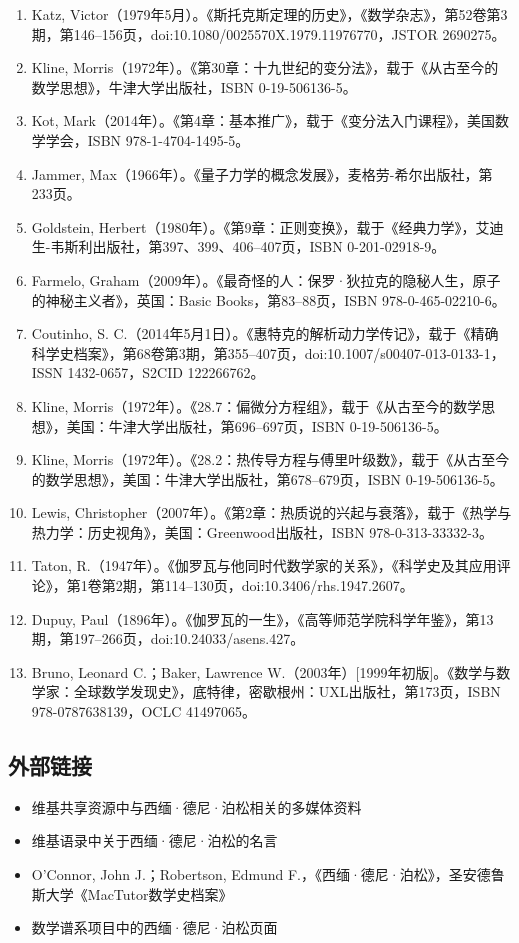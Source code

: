 \begin{enumerate}
\item Katz, Victor（1979年5月）。《斯托克斯定理的历史》，《数学杂志》，第52卷第3期，第146–156页，doi:10.1080/0025570X.1979.11976770，JSTOR 2690275。
\item Kline, Morris（1972年）。《第30章：十九世纪的变分法》，载于《从古至今的数学思想》，牛津大学出版社，ISBN 0-19-506136-5。
\item Kot, Mark（2014年）。《第4章：基本推广》，载于《变分法入门课程》，美国数学学会，ISBN 978-1-4704-1495-5。
\item Jammer, Max（1966年）。《量子力学的概念发展》，麦格劳-希尔出版社，第233页。
\item Goldstein, Herbert（1980年）。《第9章：正则变换》，载于《经典力学》，艾迪生-韦斯利出版社，第397、399、406–407页，ISBN 0-201-02918-9。
\item Farmelo, Graham（2009年）。《最奇怪的人：保罗·狄拉克的隐秘人生，原子的神秘主义者》，英国：Basic Books，第83–88页，ISBN 978-0-465-02210-6。
\item Coutinho, S. C.（2014年5月1日）。《惠特克的解析动力学传记》，载于《精确科学史档案》，第68卷第3期，第355–407页，doi:10.1007/s00407-013-0133-1，ISSN 1432-0657，S2CID 122266762。
\item Kline, Morris（1972年）。《28.7：偏微分方程组》，载于《从古至今的数学思想》，美国：牛津大学出版社，第696–697页，ISBN 0-19-506136-5。
\item Kline, Morris（1972年）。《28.2：热传导方程与傅里叶级数》，载于《从古至今的数学思想》，美国：牛津大学出版社，第678–679页，ISBN 0-19-506136-5。
\item Lewis, Christopher（2007年）。《第2章：热质说的兴起与衰落》，载于《热学与热力学：历史视角》，美国：Greenwood出版社，ISBN 978-0-313-33332-3。
\item Taton, R.（1947年）。《伽罗瓦与他同时代数学家的关系》，《科学史及其应用评论》，第1卷第2期，第114–130页，doi:10.3406/rhs.1947.2607。
\item Dupuy, Paul（1896年）。《伽罗瓦的一生》，《高等师范学院科学年鉴》，第13期，第197–266页，doi:10.24033/asens.427。
\item Bruno, Leonard C.；Baker, Lawrence W.（2003年）[1999年初版]。《数学与数学家：全球数学发现史》，底特律，密歇根州：UXL出版社，第173页，ISBN 978-0787638139，OCLC 41497065。
\end{enumerate}
\subsection{外部链接}
\begin{itemize}
\item 维基共享资源中与西缅·德尼·泊松相关的多媒体资料
\item  维基语录中关于西缅·德尼·泊松的名言
\item O'Connor, John J.；Robertson, Edmund F.，《西缅·德尼·泊松》，圣安德鲁斯大学《MacTutor数学史档案》
\item 数学谱系项目中的西缅·德尼·泊松页面
\end{itemize}